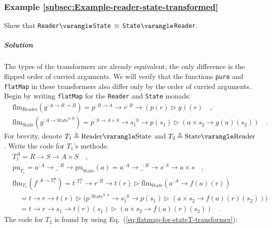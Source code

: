 \subsubsection{Example \label{subsec:Example-reader-state-transformed}\ref{subsec:Example-reader-state-transformed}}

Show that \lstinline!Reader!$\varangle$\lstinline!State!$\,\cong\,$\lstinline!State!$\varangle$\lstinline!Reader!.

\subparagraph{Solution}

The types of the transformers are already equivalent; the only difference
is the flipped order of curried arguments. We will verify that the
functions \lstinline!pure! and \lstinline!flatMap! in these transformers
also differ only by the order of curried arguments. Begin by writing
\lstinline!flatMap! for the \lstinline!Reader! and \lstinline!State!
monads:
\begin{align*}
 & \text{flm}_{\text{Reader}}(g^{:A\rightarrow R\rightarrow B})=p^{:R\rightarrow A}\rightarrow r^{:R}\rightarrow(p(r)\triangleright g)(r)\quad,\\
 & \text{flm}_{\text{State}}(g^{:A\rightarrow\text{State}^{S,B}})=p^{:S\rightarrow A\times S}\rightarrow s_{1}^{:S}\rightarrow p(s_{1})\triangleright(a\times s_{2}\rightarrow g(a)(s_{2}))\quad.
\end{align*}
For brevity, denote $T_{1}\triangleq\text{Reader}\varangle\text{State}$
and $T_{2}\triangleq\text{State}\varangle\text{Reader}$. Write the
code for $T_{1}$\textsf{'}s methods:
\begin{align*}
 & T_{1}^{A}=R\rightarrow S\rightarrow A\times S\quad,\\
 & \text{pu}_{T_{1}}=a^{:A}\rightarrow\_^{:R}\rightarrow\text{pu}_{\text{State}}(a)=a^{:A}\rightarrow\_^{:R}\rightarrow s^{:S}\rightarrow a\times s\quad,\\
 & \text{flm}_{T_{1}}(f^{:A\rightarrow T_{1}^{B}})=t^{:T_{1}^{A}}\rightarrow r^{:R}\rightarrow t(r)\triangleright\text{flm}_{\text{State}}(a^{:A}\rightarrow f(a)(r))\\
 & \quad=t\rightarrow r\rightarrow t(r)\triangleright\big(p^{:\text{State}^{S,A}}\rightarrow s_{1}^{:S}\rightarrow p(s_{1})\triangleright(a\times s_{2}\rightarrow f(a)(r)(s_{2}))\big)\\
 & \quad=t\rightarrow r\rightarrow s_{1}\rightarrow t(r)(s_{1})\triangleright(a\times s_{2}\rightarrow f(a)(r)(s_{2}))\quad.
\end{align*}
The code for $T_{2}$ is found by using Eq.~(\ref{eq:flatmap-for-stateT-transformer}):
